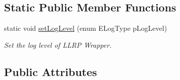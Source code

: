\subsection*{Static Public Member Functions}
\begin{DoxyCompactItemize}
\item 
static void \hyperlink{class_e_l_f_i_n_1_1_l_l_r_p_core_a6fe47b7e4999ced885a160f0c1094a56}{set\-Log\-Level} (enum E\-Log\-Type p\-Log\-Level)
\begin{DoxyCompactList}\small\item\em Set the log level of L\-L\-R\-P Wrapper. \end{DoxyCompactList}\end{DoxyCompactItemize}
\subsection*{Public Attributes}
